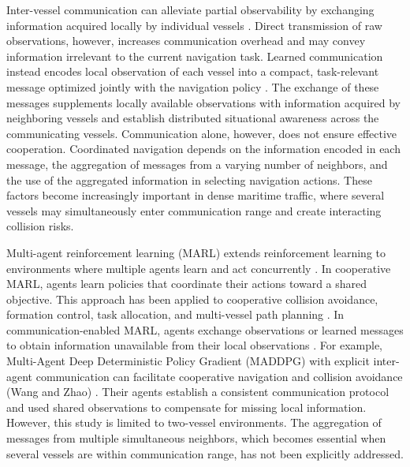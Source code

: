 \documentclass[final,5p,times,twocolumn]{elsarticle}
\begin{document}
{Inter-vessel communication can alleviate partial observability by exchanging information acquired locally by individual vessels \cite{25}. Direct transmission of raw observations, however, increases communication overhead and may convey information irrelevant to the current navigation task. Learned communication instead encodes local observation of each vessel into a compact, task-relevant message optimized jointly with the navigation policy \cite{26,27}. The exchange of these messages supplements locally available observations with information acquired by neighboring vessels and establish distributed situational awareness across the communicating vessels.
Communication alone, however, does not ensure effective cooperation. Coordinated navigation depends on the information encoded in each message, the aggregation of messages from a varying number of neighbors, and the use of the aggregated information in selecting navigation actions. These factors become increasingly important in dense maritime traffic, where several vessels may simultaneously enter communication range and create interacting collision risks.

Multi-agent reinforcement learning (MARL) extends reinforcement learning to environments where multiple agents learn and act concurrently \cite{31}. In cooperative MARL, agents learn policies that coordinate their
actions toward a shared objective. This approach has been applied to cooperative collision avoidance, formation control, task allocation, and multi-vessel path planning \cite{32} \cite{33} \cite{34}. In communication-enabled MARL, agents exchange observations or learned messages to obtain information unavailable from their local observations \cite{35}. For example, Multi-Agent Deep Deterministic Policy Gradient (MADDPG) with explicit inter-agent communication can facilitate cooperative navigation and collision avoidance (Wang and Zhao) \cite{36}. Their agents establish a consistent communication protocol and used shared observations to compensate for missing local information. However, this study is limited to two-vessel environments. The aggregation of messages from
multiple simultaneous neighbors, which becomes essential when several vessels are within communication range, has not been explicitly addressed.

}
\end{document}
